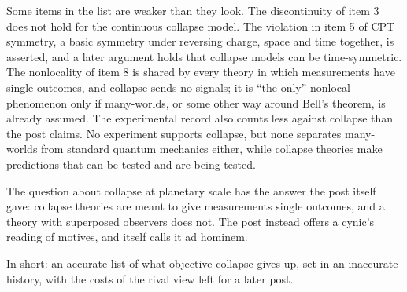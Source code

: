 \begin{afterword}
Some items in the list are weaker than they look. The discontinuity of item 3 does not hold for the continuous collapse model. The violation in item 5 of CPT symmetry, a basic symmetry under reversing charge, space and time together, is asserted, and a later argument holds that collapse models can be time-symmetric. The nonlocality of item 8 is shared by every theory in which measurements have single outcomes, and collapse sends no signals; it is ``the only'' nonlocal phenomenon only if many-worlds, or some other way around Bell's theorem, is already assumed. The experimental record also counts less against collapse than the post claims. No experiment supports collapse, but none separates many-worlds from standard quantum mechanics either, while collapse theories make predictions that can be tested and are being tested.

The question about collapse at planetary scale has the answer the post itself gave: collapse theories are meant to give measurements single outcomes, and a theory with superposed observers does not. The post instead offers a cynic's reading of motives, and itself calls it ad hominem.

In short: an accurate list of what objective collapse gives up, set in an inaccurate history, with the costs of the rival view left for a later post.
\end{afterword}

